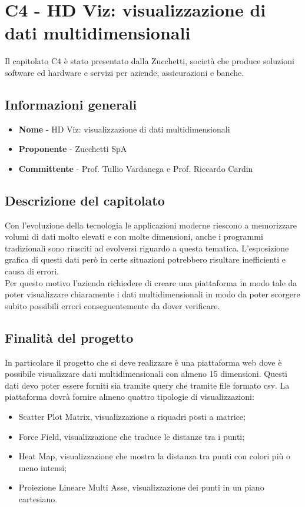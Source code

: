 \chapter{C4 - HD Viz: visualizzazione di dati multidimensionali}
Il capitolato C4 è stato presentato dalla Zucchetti, società che produce soluzioni software ed hardware e servizi per aziende, assicurazioni e banche.
\section{Informazioni generali}
\begin{itemize}
	\item \textbf{Nome} - HD Viz: visualizzazione di dati multidimensionali
	\item \textbf{Proponente} - Zucchetti SpA
	\item \textbf{Committente} - Prof. Tullio Vardanega e Prof. Riccardo Cardin
\end{itemize}
\section{Descrizione del capitolato}
Con l'evoluzione della tecnologia le applicazioni moderne riescono a memorizzare volumi di dati molto elevati e con molte dimensioni, anche i programmi tradizionali sono riusciti ad evolversi riguardo a questa tematica. L'esposizione grafica di questi dati però in certe situazioni potrebbero risultare inefficienti e causa di errori. \\
Per questo motivo l'azienda richiedere di creare una piattaforma in modo tale da poter visualizzare chiaramente i dati multidimensionali in modo da poter scorgere subito possibili errori conseguentemente da dover verificare.
\section{Finalità del progetto}
In particolare il progetto che si deve realizzare è una piattaforma web dove è possibile visualizzare dati multidimensionali con almeno 15 dimensioni. Questi dati devo poter essere forniti sia tramite query che tramite file formato csv. La piattaforma dovrà fornire almeno quattro tipologie di visualizzazioni:
\begin{itemize}
	\item Scatter Plot Matrix, visualizzazione a riquadri posti a matrice;
	\item Force Field, visualizzazione che traduce le distanze tra i punti;
	\item Heat Map, visualizzazione che mostra la distanza tra punti con colori più o meno intensi;
	\item Proiezione Lineare Multi Asse, visualizzazione dei punti in un piano cartesiano.
\end{itemize}
